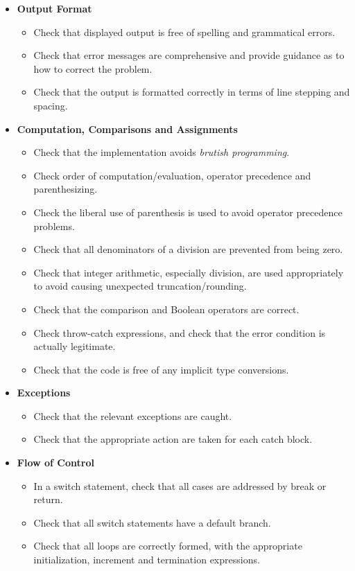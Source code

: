 \documentclass[\mainpath/main]{subfiles}
\begin{document}
\begin{itemize}
	    \item \textbf{Output Format}
	    \begin{itemize}
	    	\item Check that displayed output is free of spelling and grammatical errors.
	    	\item Check that error messages are comprehensive and provide guidance as to
			how to correct the problem.
	    	\item Check that the output is formatted correctly in terms of line stepping and
			spacing.
	    \end{itemize}
		
		\item \textbf{Computation, Comparisons and Assignments}
		\begin{itemize}
			\item Check that the implementation avoids \textit{brutish programming}.
			\item Check order of computation/evaluation, operator precedence and parenthesizing.
			\item Check the liberal use of parenthesis is used to avoid operator precedence problems.
			\item Check that all denominators of a division are prevented from being zero.
			\item Check that integer arithmetic, especially division, are used appropriately
			to avoid causing unexpected truncation/rounding.
			\item Check that the comparison and Boolean operators are correct.
			\item Check throw-catch expressions, and check that the error condition is
			actually legitimate.
			\item Check that the code is free of any implicit type conversions.
		\end{itemize}
		
		\item \textbf{Exceptions}
		\begin{itemize}
			\item Check that the relevant exceptions are caught.
			\item Check that the appropriate action are taken for each catch block.
		\end{itemize}
		
		\item \textbf{Flow of Control}
		\begin{itemize}
			\item In a switch statement, check that all cases are addressed by break or return.
			\item Check that all switch statements have a default branch.
			\item Check that all loops are correctly formed, with the appropriate initialization, increment and termination expressions.
		\end{itemize}
		

\end{itemize}
\end{document}
